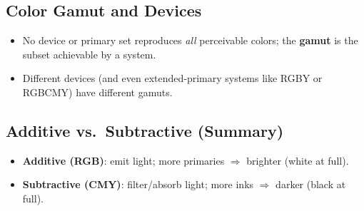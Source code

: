\documentclass[8pt,twocolumn]{extarticle}
\begin{document}
\subsection*{Color Gamut and Devices}
\begin{itemize}
  \item No device or primary set reproduces \emph{all} perceivable colors; the \textbf{gamut} is the subset achievable by a system.
  \item Different devices (and even extended‐primary systems like RGBY or RGBCMY) have different gamuts.
\end{itemize}

\subsection*{Additive vs.\ Subtractive (Summary)}
\begin{itemize}
  \item \textbf{Additive (RGB)}: emit light; more primaries $\Rightarrow$ brighter (white at full).
  \item \textbf{Subtractive (CMY)}: filter/absorb light; more inks $\Rightarrow$ darker (black at full).
\end{itemize}
\end{document}
